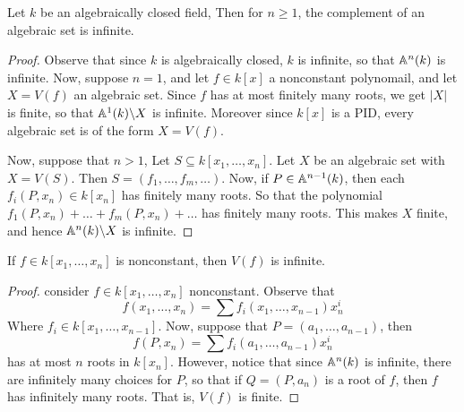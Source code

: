 \begin{theorem}\label{1.2.3}
    Let $k$ be an algebraically closed field, Then for $n \geq 1$, the
    complement of an algebraic set is infinite.
\end{theorem}
\begin{proof}
    Observe that since $k$ is algebraically closed, $k$ is infinite, so that
    $\mathbb{A}^n(k)$ is infinite. Now, suppose $n=1$, and let  $f \in k[x]$ a
    nonconstant polynomail, and let $X=V(f)$ an algebraic set. Since $f$ has at
    most finitely many roots, we get $|X|$ is finite, so that $\mathbb{A}^1(k) \backslash X$
    is infinite. Moreover since $k[x]$ is a PID, every algebraic set is of the
    form $X=V(f)$.

    Now, suppose that $n>1$, Let $S \subseteq k[x_1, \dots, x_n]$. Let $X$ be an
    algebraic set with $X=V(S)$. Then $S=(f_1, \dots, f_m, \dots)$. Now, if $P
    \in \mathbb{A}^{n-1}(k)$, then each $f_i(P,x_n) \in k[x_n]$ has finitely many roots.
    So that the polynomial $f_1(P,x_n)+\dots+f_m(P,x_n)+\dots$ has finitely many
    roots. This makes $X$ finite, and hence $\mathbb{A}^n(k) \backslash X$ is infinite.
\end{proof}
\begin{corollary}
    If $f \in k[x_1, \dots, x_n]$ is nonconstant, then $V(f)$ is infinite.
\end{corollary}
\begin{proof}
    consider  $f \in k[x_1, \dots, x_n]$ nonconstant. Observe that
    \begin{equation*}
        f(x_1, \dots, x_n)=\sum{f_i(x_1, \dots, x_{n-1})x_n^i}
    \end{equation*}
    Where $f_i \in k[x_1, \dots, x_{n-1}]$. Now, suppose that $P=(a_1, \dots,
    a_{n-1})$, then
    \begin{equation*}
        f(P, x_n)=\sum{f_i(a_1, \dots, a_{n-1})x_n^i}
    \end{equation*}
    has at most $n$ roots in  $k[x_n]$. However, notice that since $\mathbb{A}^n(k)$ is
    infinite, there are infinitely many choices for $P$, so that if  $Q=(P,a_n)$
    is a root of $f$, then  $f$ has infinitely many roots. That is,  $V(f)$ is
    finite.
\end{proof}

